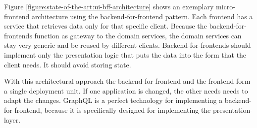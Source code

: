 Figure \ref{figure:state-of-the-art:ui-bff-architecture} shows an exemplary micro-frontend architecture using the backend-for-frontend pattern. Each frontend has a service that retrieves data only for that specific client. Because the backend-for-frontends function as gateway to the domain services, the domain services can stay very generic and be reused by different clients. Backend-for-frontends should implement only the presentation logic that puts the data into the form that the client needs. It should avoid storing state. \cite{misc:2019:leitner:backend-for-frontends}

With this architectural approach the backend-for-frontend and the frontend form a single deployment unit. If one application is changed, the other needs needs to adapt the changes. GraphQL is a perfect technology for implementing a backend-for-frontend, because it is specifically designed for implementing the presentation-layer.